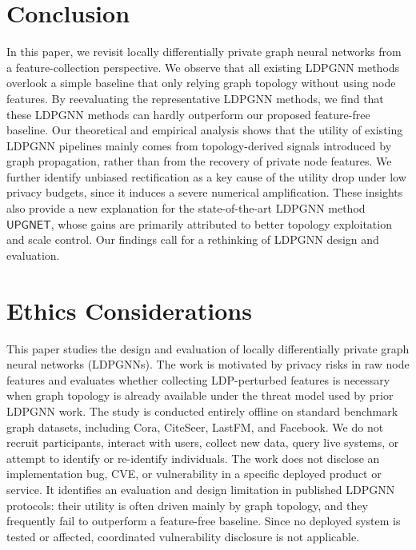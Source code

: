 \documentclass[conference,compsoc]{IEEEtran}
\theoremstyle{boldplain}
\theoremstyle{bolddefinition}
\theoremstyle{remark}
\newcommand{\ldpgnn}{LDPGNN\xspace}
\newcommand{\upgnet}{\ensuremath{\mathsf{UPGNET}}\xspace}
\begin{document}
\section{Conclusion}
\label{sec:conclusion}

In this paper, we revisit locally differentially private graph neural networks from a feature-collection perspective. 
We observe that all existing \ldpgnn methods
overlook a simple baseline that only relying graph topology without using node features.
By reevaluating the representative \ldpgnn methods, we find that these \ldpgnn methods can hardly outperform
our proposed feature-free baseline.
Our theoretical and empirical analysis shows that the utility of existing \ldpgnn pipelines mainly comes from topology-derived signals introduced by graph propagation, rather than from the recovery of private node features. 
We further identify unbiased rectification as a key cause of the utility drop under low privacy budgets, since it induces a severe numerical amplification. 
These insights also provide a new explanation for the state-of-the-art \ldpgnn method \upgnet, whose gains are primarily attributed to better topology exploitation and scale control. 
Our findings call for a rethinking of \ldpgnn design and evaluation.


\section*{Ethics Considerations}
This paper studies the design and evaluation of locally differentially private graph neural networks (LDPGNNs). The work is motivated by privacy risks in raw node features and evaluates whether collecting LDP-perturbed features is necessary when graph topology is already available under the threat model used by prior LDPGNN work.
The study is conducted entirely offline on standard benchmark graph datasets, including Cora, CiteSeer, LastFM, and Facebook. We do not recruit participants, interact with users, collect new data, query live systems, or attempt to identify or re-identify individuals. 
The work does not disclose an implementation bug, CVE, or vulnerability in a specific deployed product or service. It identifies an evaluation and design limitation in published LDPGNN protocols: their utility is often driven mainly by graph topology, and they frequently fail to outperform a feature-free baseline. Since no deployed system is tested or affected, coordinated vulnerability disclosure is not applicable.



\appendices
\end{document}
